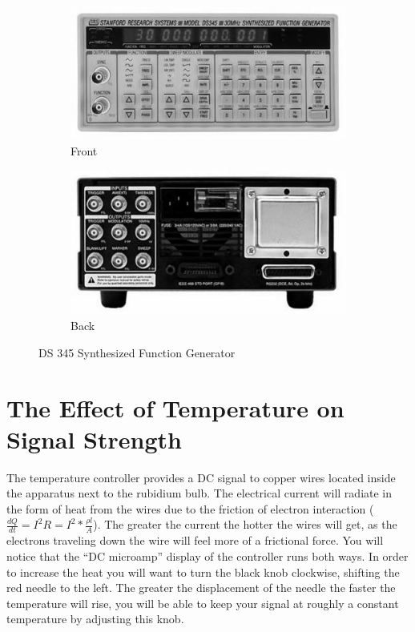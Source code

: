 \documentclass{../lab}
\begin{document}
\begin{figure}[ht]
    \begin{subfigure}[b]{0.5\linewidth}
        \centering
        \includegraphics[width=\linewidth]{images/DS345front}
        \caption{Front}
        \label{fig:DS345front}
    \end{subfigure}
    \begin{subfigure}[b]{0.5\linewidth}
        \centering
        \includegraphics[width=\linewidth]{images/DS345back}
        \caption{Back}
        \label{fig:DS345back}
    \end{subfigure}
    \caption{DS 345 Synthesized Function Generator}\label{fig:DS345}
\end{figure}

\section{The Effect of Temperature on Signal Strength}

The temperature controller provides a DC signal to copper wires located inside the apparatus next to the rubidium bulb. The electrical current will radiate in the form of heat from the wires due to the friction of electron interaction ($\frac{dQ}{dt} = I^2 R = I^2 * \frac{\rho l}{A}$).  The greater the current the hotter the wires will get, as the electrons traveling down the wire will feel more of a frictional force. You will notice that the ``DC microamp'' display of the controller runs both ways. In order to increase the heat you will want to turn the black knob clockwise, shifting the red needle to the left. The greater the displacement of the needle the faster the temperature will rise, you will be able to keep your signal at roughly a constant temperature by adjusting this knob. \\
\end{document}
